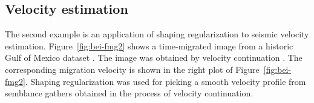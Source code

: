 \begin{comment}
\plot{lapinter}{width=\columnwidth}{Rainfall data after model-space
  regularization with 10, 100, 1000, and 10000 iterations.}

The result of shaping regularization is shown in
Figure~\ref{fig:gaussinter}. Two-dimensional triangle smoothing was
applied as a shaping operator. The method converges to the
machine-precision tolerance at about 32 iterations. Since triangle
smoothing has approximately the same cost as Laplacian filtering, the
method appears to be 300 times more efficient. Even more importantly,
the very early iterations (left plot in Figure~\ref{fig:gaussinter})
produce reasonable results. Thanks to the fact that smoothing is
applied at each iterations, we are guaranteed to end up with a smooth
model even when the iterative process stops early.
 
\plot{gaussinter}{width=\columnwidth}{Rainfall data after shaping
  regularization with 10 and 40 iterations.}

Figure~\ref{fig:stat} shows correlation plots of the observed and
interpolated data points for the 367 points that were not used in the
interpolation experiment.  If we take into account the fairly
unpredictable distribution of rainfall, the correlation is relatively
good in comparison with analogous results of other methods used in the
Spatial Interpolation Contest \cite{jgida}.

\plot{stat}{width=\columnwidth}{Correlation between observed and
  predicted rainfall data values. Left: Tikhonov's regularization
  result, right: shaping regularization result.}

\end{comment}


\subsection{Velocity estimation}
The second example is an application of shaping regularization to seismic
velocity estimation. Figure~\ref{fig:bei-fmg2} shows a time-migrated image
from a historic Gulf of Mexico dataset \cite[]{bei}. The image was obtained by
velocity continuation \cite[]{GEO68-05-16621672}. The corresponding migration
velocity is shown in the right plot of Figure~\ref{fig:bei-fmg2}. Shaping
regularization was used for picking a smooth velocity profile from semblance
gathers obtained in the process of velocity continuation.


